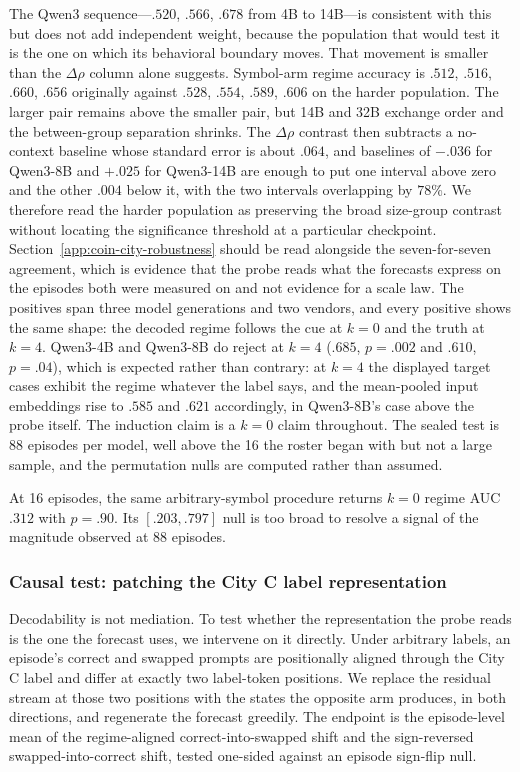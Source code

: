 The Qwen3 sequence---$.520$, $.566$, $.678$ from 4B to 14B---is consistent with
this but does not add independent weight, because the population that would test
it is the one on which its behavioral boundary moves. That movement is smaller
than the $\Delta\rho$ column alone suggests. Symbol-arm regime accuracy is
$.512$, $.516$, $.660$, $.656$ originally against $.528$, $.554$, $.589$, $.606$
on the harder population. The larger pair remains above the smaller pair, but
14B and 32B exchange order and the between-group separation shrinks. The
$\Delta\rho$ contrast then subtracts a no-context
baseline whose standard error is about $.064$, and baselines of $-.036$ for
Qwen3-8B and $+.025$ for Qwen3-14B are enough to put one interval above zero and
the other $.004$ below it, with the two intervals overlapping by $78\%$. We
therefore read the harder population as preserving the broad size-group contrast
without locating the significance threshold at a particular checkpoint.
Section~\ref{app:coin-city-robustness} should be read alongside the
seven-for-seven agreement, which is evidence that the probe reads what the
forecasts express on the episodes both were measured on and not evidence for a
scale law. The positives span three model generations and two
vendors, and every positive shows the same shape: the decoded regime follows the
cue at $k=0$ and the truth at $k=4$.
Qwen3-4B and Qwen3-8B do reject at $k=4$ ($.685$, $p=.002$ and $.610$, $p=.04$),
which is expected rather than contrary: at $k=4$ the displayed target cases
exhibit the regime whatever the label says, and the mean-pooled input embeddings
rise to $.585$ and $.621$ accordingly, in Qwen3-8B's case above the probe itself.
The induction claim is a $k=0$ claim throughout. The sealed test is 88 episodes
per model, well above the 16 the roster began with but not a large sample, and the
permutation nulls are computed rather than assumed.

At 16 episodes, the same arbitrary-symbol procedure returns $k=0$ regime AUC
$.312$ with $p=.90$. Its $[.203,.797]$ null is too broad to resolve a signal of
the magnitude observed at 88 episodes.

\subsubsection{Causal test: patching the City C label representation}
\label{app:coin-city-causal-patch}

Decodability is not mediation. To test whether the representation the probe reads
is the one the forecast uses, we intervene on it directly. Under arbitrary labels, an episode's correct and swapped prompts are
positionally aligned through the City C label and differ at exactly two label-token
positions.
We replace the residual stream at those two positions with the states the opposite
arm produces, in both directions, and regenerate the forecast greedily. The
endpoint is the episode-level mean of the regime-aligned correct-into-swapped
shift and the sign-reversed swapped-into-correct shift, tested one-sided against
an episode sign-flip null.

